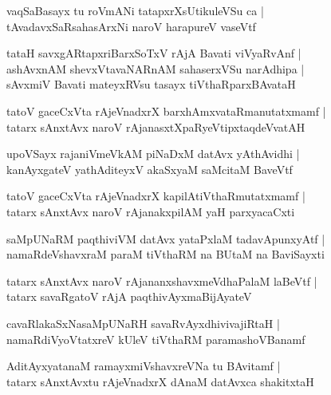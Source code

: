 \documentclass[twoside,12pt,openright]{book}
\newcounter{shloka}[chapter]
\begin{document}
\begin{shloka}
vaqSaBasayx tu roVmANi tatapxrXsUtikuleVSu ca |\\
tAvadavxSaRsahasArxNi naroV harapureV vaseVtf
\end{shloka}

\begin{shloka}
tataH savxgARtapxriBarxSoTxV rAjA Bavati viVyaRvAnf |\\
ashAvxnAM shevxVtavaNARnAM sahaserxVSu narAdhipa |\\
sAvxmiV Bavati mateyxRVsu tasayx tiVthaRparxBAvataH 
\end{shloka}

\begin{shloka}
tatoV gaceCxVta rAjeVnadxrX barxhAmxvataRmanutatxmamf |\\
tatarx sAnxtAvx naroV rAjanasxtXpaRyeVtipxtaqdeVvatAH 
\end{shloka}

\begin{shloka}
upoVSayx rajaniVmeVkAM piNaDxM datAvx yAthAvidhi |\\
kanAyxgateV yathAditeyxV akaSxyaM saMcitaM BaveVtf
\end{shloka}

\begin{shloka}
tatoV gaceCxVta rAjeVnadxrX kapilAtiVthaRmutatxmamf |\\
tatarx sAnxtAvx naroV rAjanakxpilAM yaH parxyacaCxti 
\end{shloka}

\begin{shloka}
saMpUNaRM paqthiviVM datAvx yataPxlaM tadavApunxyAtf |\\
namaRdeVshavxraM paraM tiVthaRM na BUtaM na BaviSayxti 
\end{shloka}

\begin{shloka}
tatarx sAnxtAvx naroV rAjananxshavxmeVdhaPalaM laBeVtf |\\
tatarx savaRgatoV rAjA paqthivAyxmaBijAyateV 
\end{shloka}

\begin{shloka}
cavaRlakaSxNasaMpUNaRH savaRvAyxdhivivajiRtaH |\\
namaRdiVyoVtatxreV kUleV tiVthaRM paramashoVBanamf 
\end{shloka}

\begin{shloka}
AditAyxyatanaM ramayxmiVshavxreVNa tu BAvitamf |\\
tatarx sAnxtAvxtu rAjeVnadxrX dAnaM datAvxca shakitxtaH 
\end{shloka}
\end{document}
